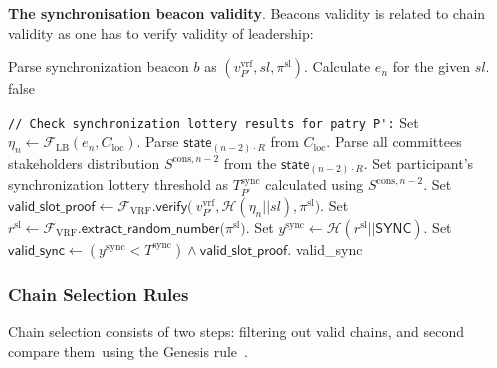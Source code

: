 \bigbreak
\bigbreak
\noindent
\textbf{The synchronisation beacon validity}.
Beacons validity is related to chain validity as one has to verify validity of leadership:
\begin{protocol}
    \caption{$\textsf{ValidBeacon}(P, R, b, \mathcal{C}_{\text{loc}})$}
    \begin{algorithmic}[1]
        \State Parse synchronization beacon $b$ as $(v_{P'}^{\text{vrf}}, sl, \pi^{\text{sl}})$.
        \State Calculate $e_n$ for the given $sl$.
            \State \Return \textsf{false}
        \EndIf

        \noindent
        \lstinline|// Check synchronization lottery results for patry P':|
        \State Set ${\eta_{n} \leftarrow \mathcal{F}_{\text{LB}}(e_{n}, C_{\text{loc}})}$.
        \State Parse $\textsf{state}_{(n - 2)\cdot R}$ from $C_{\text{loc}}$.
        \State Parse all committees stakeholders distribution $S^{\text{cons}, n - 2}$ from the $\textsf{state}_{(n - 2)\cdot R}$.
        \State Set participant's synchronization lottery threshold as $T_{P'}^{\text{sync}}$ calculated using $S^{\text{cons}, {n - 2}}$.
        \State Set $\textsf{valid\_slot\_proof} \leftarrow \mathcal{F}_{\text{VRF}}\textsf{.verify(}\
        v_{P'}^{\text{vrf}}, \mathcal{H}(\eta_n || sl),\pi^{\text{sl}} \textsf{)}$.
        \State Set ${r^{\text{sl}} \leftarrow \mathcal{F}_{\text{VRF}}\textsf{.extract\_random\_number(}\pi^{\text{sl}}\textsf{)}}$.
        \State Set ${y^{\text{sync}} \leftarrow {\mathcal{H}(r^{\text{sl}} || \textsf{SYNC})}}$.
        \State Set ${\textsf{valid\_sync} \leftarrow (y^{\text{sync}} < T^{\text{sync}}) \wedge \textsf{valid\_slot\_proof}}$.
        \State \Return \textsf{valid\_sync}

    \end{algorithmic}\label{alg:algorithm-6}
\end{protocol}

\subsubsection{Chain Selection Rules}
Chain selection consists of two steps: ﬁltering out valid chains, and second compare them\
using the Genesis rule~\cite{Badertscher2018}.

